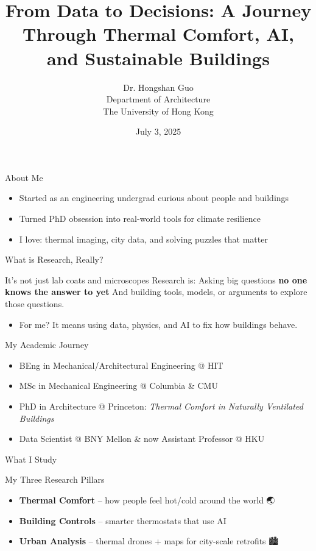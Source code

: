 \documentclass{beamer}
\title[Computational Building Science]{From Data to Decisions: \newline A Journey Through Thermal Comfort, AI, and Sustainable Buildings}
\author[H. Guo]{Dr. Hongshan Guo \\ Department of Architecture \\ The University of Hong Kong}
\date[July 3, 2025]{July 3, 2025}
\begin{document}
\begin{frame}
  \titlepage
\end{frame}

\begin{frame}{About Me}
  \begin{itemize}
    \item Started as an engineering undergrad curious about people and buildings
    \item Turned PhD obsession into real-world tools for climate resilience
    \item I love: thermal imaging, city data, and solving puzzles that matter
  \end{itemize}
\end{frame}

\begin{frame}{What is Research, Really?}
  \begin{block}{It’s not just lab coats and microscopes}
    Research is: Asking big questions \textbf{no one knows the answer to yet}\newline
    And building tools, models, or arguments to explore those questions.
  \end{block}
  \pause
  \begin{itemize}
    \item For me? It means using data, physics, and AI to fix how buildings behave.
  \end{itemize}
\end{frame}

\begin{frame}{My Academic Journey}
  \begin{itemize}
    \item BEng in Mechanical/Architectural Engineering @ HIT
    \item MSc in Mechanical Engineering @ Columbia & CMU
    \item PhD in Architecture @ Princeton: \emph{Thermal Comfort in Naturally Ventilated Buildings}
    \item Data Scientist @ BNY Mellon \& now Assistant Professor @ HKU
  \end{itemize}
\end{frame}

\begin{frame}{What I Study}
  \begin{block}{My Three Research Pillars}
    \begin{itemize}
      \item \textbf{Thermal Comfort} – how people feel hot/cold around the world 🌏
      \item \textbf{Building Controls} – smarter thermostats that use AI 🧠
      \item \textbf{Urban Analysis} – thermal drones + maps for city-scale retrofits 🏙️
    \end{itemize}
  \end{block}
\end{frame}
\end{document}
